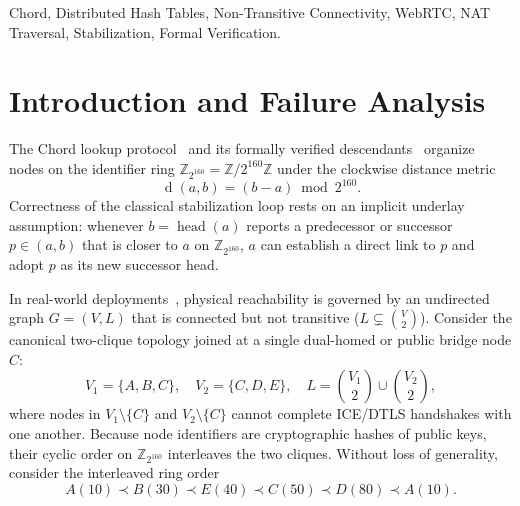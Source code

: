 \documentclass[journal]{IEEEtran}
\newcommand{\Ring}{\mathbb{Z}_{2^{160}}}
\newcommand{\dist}{\operatorname{d}}
\newcommand{\Head}{\operatorname{head}}
\begin{document}
\begin{IEEEkeywords}
Chord, Distributed Hash Tables, Non-Transitive Connectivity, WebRTC, NAT
Traversal, Stabilization, Formal Verification.
\end{IEEEkeywords}

\section{Introduction and Failure Analysis}

The Chord lookup protocol~\cite{Stoica2001,Stoica2003} and its formally
verified descendants~\cite{Zave2017} organize nodes on the identifier ring
$\Ring = \mathbb{Z}/2^{160}\mathbb{Z}$ under the clockwise distance metric
\begin{equation}
  \dist(a, b) = (b - a) \bmod 2^{160}.
\end{equation}
Correctness of the classical stabilization loop rests on an implicit underlay
assumption: whenever $b = \Head(a)$ reports a predecessor or successor
$p \in (a, b)$ that is closer to $a$ on $\Ring$, $a$ can establish a direct link
to $p$ and adopt $p$ as its new successor head.

In real-world deployments~\cite{Freedman2005,Ford2006}, physical reachability is
governed by an undirected graph $G = (V, L)$ that is connected but not
transitive ($L \subsetneq \binom{V}{2}$). Consider the canonical two-clique
topology joined at a single dual-homed or public bridge node $C$:
\begin{equation}
  V_1 = \{A, B, C\}, \quad V_2 = \{C, D, E\}, \quad
  L = \binom{V_1}{2} \cup \binom{V_2}{2},
  \label{eq:two-clique}
\end{equation}
where nodes in $V_1 \setminus \{C\}$ and $V_2 \setminus \{C\}$ cannot complete
ICE/DTLS handshakes with one another. Because node identifiers are cryptographic
hashes of public keys, their cyclic order on $\Ring$ interleaves the two
cliques. Without loss of generality, consider the interleaved ring order
\begin{equation}
  A(10) \prec B(30) \prec E(40) \prec C(50) \prec D(80) \prec A(10).
  \label{eq:interleaved-order}
\end{equation}
\end{document}

